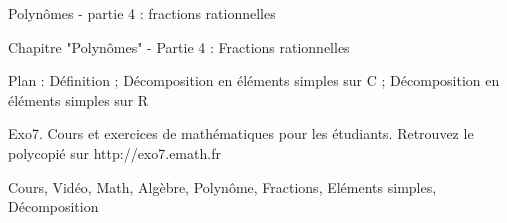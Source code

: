 
Polynômes - partie 4 : fractions rationnelles



Chapitre "Polynômes" - Partie 4 : Fractions rationnelles

Plan : Définition ; Décomposition en éléments simples sur C ; Décomposition en éléments simples sur R

Exo7. Cours et exercices de mathématiques pour les étudiants.
Retrouvez le polycopié sur http://exo7.emath.fr


Cours, Vidéo, Math, Algèbre, Polynôme, Fractions, Eléments simples, Décomposition



